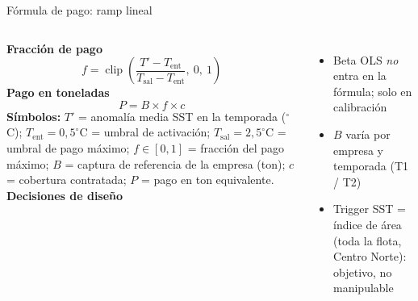 \documentclass[aspectratio=169,11pt]{beamer}
\begin{document}
\begin{frame}{Fórmula de pago: ramp lineal}
  \begin{columns}[T]
      \textbf{Fracción de pago}
      \[
        f = \operatorname{clip}\!\left(\frac{T' - T_{\text{ent}}}{T_{\text{sal}} - T_{\text{ent}}},\ 0,\ 1\right)
      \]
      \textbf{Pago en toneladas}
      \[
        P = B \times f \times c
      \]
      \smallskip
      {\scriptsize\textbf{Símbolos:} $T'$ = anomalía media SST en la temporada ($^\circ$C); $T_{\text{ent}} = 0{,}5^\circ$C = umbral de activación; $T_{\text{sal}} = 2{,}5^\circ$C = umbral de pago máximo; $f \in [0,1]$ = fracción del pago máximo; $B$ = captura de referencia de la empresa (ton); $c$ = cobertura contratada; $P$ = pago en ton equivalente.}
      \textbf{Decisiones de diseño}
      \begin{itemize}
        \item Beta OLS \emph{no} entra en la fórmula; solo en calibración
        \item $B$ varía por empresa y temporada (T1 / T2)
        \item Trigger SST = índice de área (toda la flota, Centro Norte): objetivo, no manipulable
      \end{itemize}
  \end{columns}
\end{frame}
\end{document}
